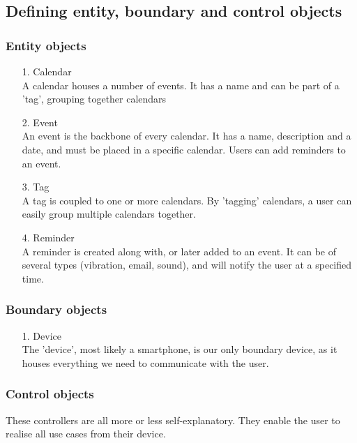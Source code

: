 \subsection{Defining entity, boundary and control objects}

\subsubsection{Entity objects}

\begin{enumerate}
	\item[1.] Calendar \hfill \\
	A calendar houses a number of events. It has a name and can be part of a 'tag', grouping together calendars
	\item[2.] Event \hfill \\
	An event is the backbone of every calendar. It has a name, description and a date, and must be placed in a specific calendar. Users can add reminders to an event.
	\item[3.] Tag \hfill \\
	A tag is coupled to one or more calendars. By 'tagging' calendars, a user can easily group multiple calendars together.
	\item[4.] Reminder \hfill \\
	A reminder is created along with, or later added to an event. It can be of several types (vibration, email, sound), and will notify the user at a specified time.
\end{enumerate}

\subsubsection{Boundary objects}

\begin{enumerate}
	\item[1.] Device \hfill \\
	The 'device', most likely a smartphone, is our only boundary device, as it houses everything we need to communicate with the user.
\end{enumerate}

\subsubsection{Control objects}

These controllers are all more or less self-explanatory. They enable the user to realise all use cases from their device.

